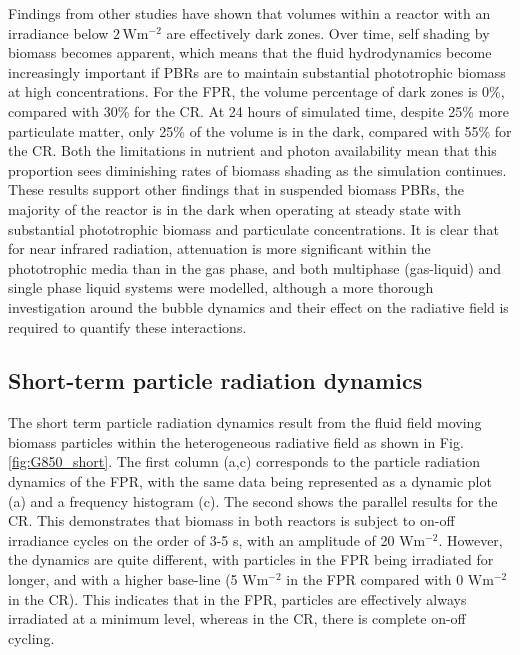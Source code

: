 Findings from other studies \cite{Kong2014} have shown that volumes within a reactor with an irradiance below $\mathrm{2\, Wm^{-2}}$ are effectively dark zones. Over time, self shading by biomass becomes apparent, which means that the fluid hydrodynamics become increasingly important if PBRs are to maintain substantial phototrophic biomass at high concentrations. For the FPR, the volume percentage of dark zones is 0\%, compared with 30\% for the CR. At 24 hours of simulated time, despite  25\% more particulate matter, only 25\% of the volume is in the dark, compared with 55\% for the CR. Both the limitations in nutrient and photon availability mean that this proportion sees diminishing rates of biomass shading as the simulation continues. These results support other findings that in suspended biomass PBRs, the majority of the reactor is in the dark when operating at steady state with substantial phototrophic biomass and particulate concentrations. It is clear that for near infrared radiation, attenuation is more significant within the phototrophic media than in the gas phase, and both multiphase (gas-liquid) and single phase liquid systems were modelled, although a more thorough investigation around the bubble dynamics and their effect on the radiative field is required to quantify these interactions.

\subsection{Short-term particle radiation dynamics}
\label{ssec:strf}
The short term particle radiation dynamics result from the fluid field moving biomass particles within the heterogeneous radiative field as shown in Fig. \ref{fig:G850_short}. The first column (a,c) corresponds to the particle radiation dynamics of the FPR, with the same data being represented as a dynamic plot (a) and a frequency histogram (c). The second shows the parallel results for the CR. This demonstrates that biomass in both reactors is subject to on-off irradiance cycles on the order of 3-5 s, with an amplitude of 20 $\mathrm{W m^{-2}}$. However, the dynamics are quite different, with particles in the FPR being irradiated for longer, and with a higher base-line (5 $\mathrm{W m^{-2}}$ in the FPR compared with 0 $\mathrm{W m^{-2}}$ in the CR). This indicates that in the FPR, particles are effectively always irradiated at a minimum level, whereas in the CR,  there is complete on-off cycling. 

